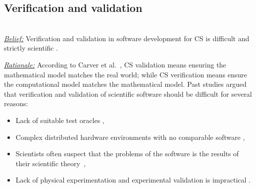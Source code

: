 \documentclass[sigconf,review,anonymous]{acmart}
\newcommand{\bi}{\begin{itemize}}
\newcommand{\ei}{\end{itemize}}
\begin{document}
\subsection{Verification and validation}~\\
 \textit{\underline{Belief:}} 
Verification and validation in software development for CS is difficult and strictly scientific \cite{carver07_environment, kanewala13_testing, carver06_hpc, Prabhu11_cssurvey, basili08_hpc}.

\noindent \textit{\underline{Rationale:}} 
According to Carver et al.~\cite{carver07_environment},
CS validation means ensuring the mathematical model matches the real world; while CS verification means ensure the computational model matches the mathematical model. Past studies argued that verification and validation of scientific software should be  difficult for  several reasons:

\bi
    \item Lack of suitable test oracles \cite{kanewala13_testing},
    \item Complex distributed hardware environments with no comparable software \cite{basili08_hpc},
    \item Scientists often suspect that the problems of the software is the results of their scientific theory~\cite{faulk09_secs},
    \item Lack of physical experimentation and experimental validation is impractical \cite{carver07_environment}. 
\ei


\end{document}

